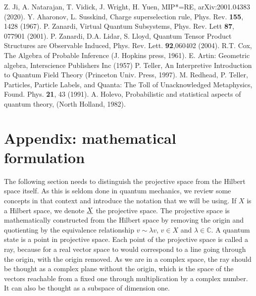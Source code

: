 \documentclass[aps,prl,amsmath,amssymb,twocolumn,nofootinbib]{revtex4}
\theoremstyle{plain}
\theoremstyle{definition}
\theoremstyle{remark}
\newcommand{\pj}[1] {\underbar{$#1$}}
\begin{document}
\begin{references}
Z. Ji, A. Natarajan, T. Vidick, J. Wright, H. Yuen, MIP*=RE, arXiv:2001.04383 (2020). %
Y. Aharonov, L. Susskind, Charge superselection
  rule, Phys. Rev. {\bf 155}, 1428 (1967).
P. Zanardi, Virtual Quantum Subsystems, Phys. Rev.
  Lett {\bf 87}, 077901 (2001).
 P. Zanardi, D.A. Lidar, S. Lloyd, Quantum
  Tensor Product Structures are Observable Induced, Phys. Rev. Lett.
  {\bf 92},060402 (2004).
R.T. Cox, The Algebra of Probable Inference (J. Hopkins
  press, 1961).
 E. Artin: Geometric algebra, Interscience Publishers Inc (1957)
P. Teller, An Interpretive Introduction to Quantum
  Field Theory (Princeton Univ. Press, 1997).  
M. Redhead, P. Teller, Particles, Particle Labels, and
  Quanta: The Toll of Unacknowledged Metaphysics, Found. Phys. {\bf
    21}, 43 (1991).
A. Holevo, Probabilistic and statistical aspects of
  quantum theory, (North Holland, 1982).
\end{references}

\baselineskip

\section{Appendix: mathematical formulation}\label{app}
\setcounter{section}{1}

The following section needs to distinguish the projective space from
the Hilbert space itself. As this is seldom done in quantum mechanics,
we review some concepts in that context and introduce the notation
that we will be using. If $X$ is a Hilbert space, we denote $\pj{X}$
the projective space. The projective space is mathematically
constructed from the Hilbert space by removing the origin and
quotienting by the equivalence relationship $v \sim \lambda v$, $v\in
X$ and $\lambda\in\mathbb{C}$. A quantum state is a point in
projective space. Each point of the projective space is called a ray,
because for a real vector space to would correspond to a line going through
the origin, with the origin removed. As we are in a complex space, the
ray should be thought as a complex plane without the origin, which is
the space of the vectors reachable from a fixed one through
multiplication by a complex number. It can also be thought as a
subspace of dimension one.
\end{document}
